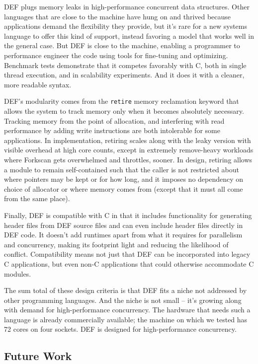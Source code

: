 DEF plugs memory leaks in high-performance concurrent data structures.  Other languages that are close to the machine have hung on and thrived because applications demand the flexibility they provide, but it's rare for a new systems language to offer this kind of support, instead favoring a model that works well in the general case.  But DEF is close to the machine, enabling a programmer to performance engineer the code using tools for fine-tuning and optimizing.  Benchmark tests demonstrate that it competes favorably with C, both in single thread execution, and in scalability experiments.  And it does it with a cleaner, more readable syntax.

DEF's modularity comes from the \texttt{retire} memory reclamation keyword that allows the system to track memory only when it becomes absolutely necessary.  Tracking memory from the point of allocation, and interfering with read performance by adding write instructions are both intolerable for some applications.  In implementation, retiring scales along with the leaky version with visible overhead at high core counts, except in extremely remove-heavy workloads where Forkscan gets overwhelmed and throttles, sooner.  In design, retiring allows a module to remain self-contained such that the caller is not restricted about where pointers may be kept or for how long, and it imposes no dependency on choice of allocator or where memory comes from (except that it must all come from the same place).

Finally, DEF is compatible with C in that it includes functionality for generating header files from DEF source files and can even include header files directly in DEF code.  It doesn't add runtimes apart from what it requires for parallelism and concurrency, making its footprint light and reducing the likelihood of conflict.  Compatibility means not just that DEF can be incorporated into legacy C applications, but even non-C applications that could otherwise accommodate C modules.

The sum total of these design criteria is that DEF fits a niche not addressed by other programming languages.  And the niche is not small -- it's growing along with demand for high-performance concurrency.  The hardware that needs such a language is already commercially available; the machine on which we tested has 72 cores on four sockets.  DEF is designed for high-performance concurrency.

\subsection{Future Work}

